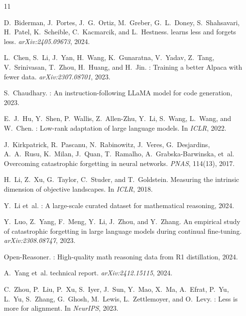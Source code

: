 \documentclass{article}
\begin{document}
\begin{thebibliography}{11}

D.~Biderman, J.~Portes, J.~G.~Ortiz, M.~Greber, G.~L.~Doney, S.~Shahsavari, H.~Patel, K.~Scheible, C.~Kacmarcik, and L.~Hestness.
 learns less and forgets less.
\newblock \emph{arXiv:2405.09673}, 2024.

L.~Chen, S.~Li, J.~Yan, H.~Wang, K.~Gunaratna, V.~Yadav, Z.~Tang, V.~Srinivasan, T.~Zhou, H.~Huang, and H.~Jin.
: Training a better {Alpaca} with fewer data.
\newblock \emph{arXiv:2307.08701}, 2023.

S.~Chaudhary.
: An instruction-following {LLaMA} model for code generation, 2023.

E.~J.~Hu, Y.~Shen, P.~Wallis, Z.~Allen-Zhu, Y.~Li, S.~Wang, L.~Wang, and W.~Chen.
: Low-rank adaptation of large language models.
\newblock In \emph{ICLR}, 2022.

J.~Kirkpatrick, R.~Pascanu, N.~Rabinowitz, J.~Veres, G.~Desjardins, A.~A.~Rusu, K.~Milan, J.~Quan, T.~Ramalho, A.~Grabska-Barwinska, et~al.
\newblock Overcoming catastrophic forgetting in neural networks.
\newblock \emph{PNAS}, 114(13), 2017.

H.~Li, Z.~Xu, G.~Taylor, C.~Studer, and T.~Goldstein.
\newblock Measuring the intrinsic dimension of objective landscapes.
\newblock In \emph{ICLR}, 2018.

Y.~Li et~al.
: A large-scale curated dataset for mathematical reasoning, 2024.

Y.~Luo, Z.~Yang, F.~Meng, Y.~Li, J.~Zhou, and Y.~Zhang.
\newblock An empirical study of catastrophic forgetting in large language models during continual fine-tuning.
\newblock \emph{arXiv:2308.08747}, 2023.

{Open-Reasoner}.
: High-quality math reasoning data from {R1} distillation, 2024.

A.~Yang et~al.
 technical report.
\newblock \emph{arXiv:2412.15115}, 2024.

C.~Zhou, P.~Liu, P.~Xu, S.~Iyer, J.~Sun, Y.~Mao, X.~Ma, A.~Efrat, P.~Yu, L.~Yu, S.~Zhang, G.~Ghosh, M.~Lewis, L.~Zettlemoyer, and O.~Levy.
: Less is more for alignment.
\newblock In \emph{NeurIPS}, 2023.

\end{thebibliography}
\end{document}
